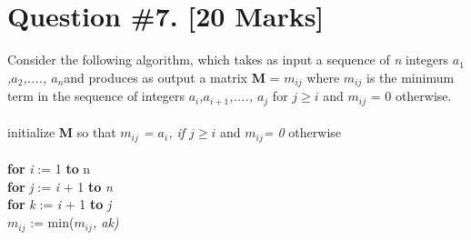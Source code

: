 \documentclass{article}
\begin{document}
\section{Question \#7. [20 Marks]}

Consider the following algorithm, which takes as input a sequence of \emph{n} integers \emph{$a_{1}$,$a_{2}$,...., $a_{n}$}and produces as output a matrix \textbf{M} = {$m_{ij}$} where \emph{{$m_{ij}$}} is the minimum term in the sequence of integers \emph{$a_{i}$,$a_{i+1}$,...., $a_{j}$} for \emph {$j \geq i$} and \emph {$m_{ij}$} = 0 otherwise. \\ \\ \indent initialize \textbf {M} so that \emph{{$m_{ij}$} = $a_{i}$, if $j \geq i$} and \emph{ $m_{ij}$= 0 }otherwise \\ \\ \indent \textbf{for} \emph{i} := 1 \textbf {to} n \\ 
\indent \indent \textbf {for} \emph{j} := \emph {i} + 1 \textbf{to} \emph{n} \\ 
\indent \indent \indent \textbf {for} \emph{k} := \emph {i} + 1 \textbf{to} \emph{j} \\ 
\indent \indent \indent \indent \emph{{$m_{ij}$}} := min(\emph{{$m_{ij}$}, ak)} \\ \\ 
\end{document}
